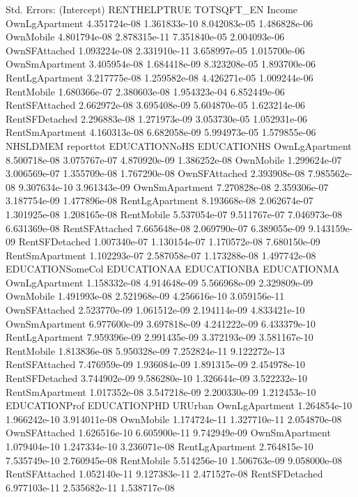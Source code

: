 \documentclass{article}
\begin{document}
\begin{Schunk}
\begin{Soutput}
Std. Errors:
                 (Intercept) RENTHELPTRUE   TOTSQFT_EN       Income
OwnLgApartment  4.351724e-08 1.361833e-10 8.042083e-05 1.486828e-06
OwnMobile       4.801794e-08 2.878315e-11 7.351840e-05 2.004093e-06
OwnSFAttached   1.093224e-08 2.331910e-11 3.658997e-05 1.015700e-06
OwnSmApartment  3.405954e-08 1.684418e-09 8.323208e-05 1.893700e-06
RentLgApartment 3.217775e-08 1.259582e-08 4.426271e-05 1.009244e-06
RentMobile      1.680366e-07 2.380603e-08 1.954323e-04 6.852449e-06
RentSFAttached  2.662972e-08 3.695408e-09 5.604870e-05 1.623214e-06
RentSFDetached  2.296883e-08 1.271973e-09 3.053730e-05 1.052931e-06
RentSmApartment 4.160313e-08 6.682058e-09 5.994973e-05 1.579855e-06
                    NHSLDMEM    reporttot EDUCATIONNoHS  EDUCATIONHS
OwnLgApartment  8.500718e-08 3.075767e-07  4.870920e-09 1.386252e-08
OwnMobile       1.299624e-07 3.006569e-07  1.355709e-08 1.767290e-08
OwnSFAttached   2.393908e-08 7.985562e-08  9.307634e-10 3.961343e-09
OwnSmApartment  7.270828e-08 2.359306e-07  3.187754e-09 1.477896e-08
RentLgApartment 8.193668e-08 2.062674e-07  1.301925e-08 1.208165e-08
RentMobile      5.537054e-07 9.511767e-07  7.046973e-08 6.631369e-08
RentSFAttached  7.665648e-08 2.069790e-07  6.389055e-09 9.143159e-09
RentSFDetached  1.007340e-07 1.130154e-07  1.170572e-08 7.680150e-09
RentSmApartment 1.102293e-07 2.587058e-07  1.173288e-08 1.497742e-08
                EDUCATIONSomeCol  EDUCATIONAA  EDUCATIONBA  EDUCATIONMA
OwnLgApartment      1.158332e-08 4.914648e-09 5.566968e-09 2.329809e-09
OwnMobile           1.491993e-08 2.521968e-09 4.256616e-10 3.059156e-11
OwnSFAttached       2.523770e-09 1.061512e-09 2.194114e-09 4.833421e-10
OwnSmApartment      6.977600e-09 3.697818e-09 4.241222e-09 6.433379e-10
RentLgApartment     7.959396e-09 2.991435e-09 3.372193e-09 3.581167e-10
RentMobile          1.813836e-08 5.950328e-09 7.252824e-11 9.122272e-13
RentSFAttached      7.476959e-09 1.936084e-09 1.891315e-09 2.454978e-10
RentSFDetached      3.744902e-09 9.586280e-10 1.326644e-09 3.522232e-10
RentSmApartment     1.017352e-08 3.547218e-09 2.200330e-09 1.212453e-10
                EDUCATIONProf EDUCATIONPHD      URUrban
OwnLgApartment   1.264854e-10 1.966242e-10 3.914011e-08
OwnMobile        1.174724e-11 1.327710e-11 2.054870e-08
OwnSFAttached    1.626516e-10 6.605900e-11 9.742949e-09
OwnSmApartment   1.079404e-10 1.247334e-10 3.236071e-08
RentLgApartment  2.764815e-10 7.535749e-10 2.760945e-08
RentMobile       5.514256e-10 1.506763e-09 9.058000e-08
RentSFAttached   1.052140e-11 9.127383e-11 2.471527e-08
RentSFDetached   6.977103e-11 2.535682e-11 1.538717e-08

\end{Soutput}
\end{Schunk}
\end{document}
